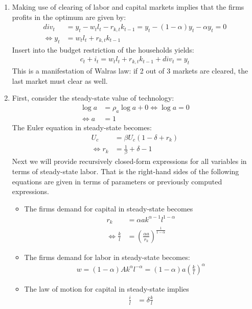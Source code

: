 \begin{enumerate}
\item Making use of clearing of labor and capital markets implies that the firms profits in the optimum are given by:
\begin{align*}
{div}_t &= y_t - w_t l_{t} - r_{k,t} k_{t-1} = y_t - (1-\alpha)y_t - \alpha y_t = 0
\\
\Leftrightarrow y_t &= w_t l_{t} + r_{k,t} k_{t-1}
\end{align*}
Insert into the budget restriction of the households yields:
\begin{align*}
c_t + i_t = w_t l_{t} + r_{k,t} k_{t-1} + {div}_t = y_t
\end{align*}
This is a manifestation of Walras law: if 2 out of 3 markets are cleared, the last market must clear as well.

\item First, consider the steady-state value of technology:
\begin{align*}
\log{a}&=\rho_a \log{a} + 0 \Leftrightarrow \log{a} = 0
\\
\Leftrightarrow a &= 1 
\end{align*}
The Euler equation in steady-state becomes:
\begin{align*}
U_c &= \beta U_c (1-\delta+r_k)
\\
\Leftrightarrow r_k &= \frac{1}{\beta} + \delta - 1
\end{align*}
Next we will provide recursively closed-form expressions for all variables in terms of steady-state labor.
That is the right-hand sides of the following equations are given in terms of parameters or previously computed expressions.

\begin{itemize}

\item The firms demand for capital in steady-state becomes
\begin{align*}
r_k &= \alpha a k^{\alpha-1} l^{1-\alpha}
\\
\Leftrightarrow \frac{k}{l} &= {\left(\frac{\alpha a}{r_k}\right)}^{\frac{1}{1-\alpha}}
\end{align*}

\item The firms demand for labor in steady-state becomes:
\begin{align*}
w = (1-\alpha) A k^\alpha l^{-\alpha} = (1-\alpha)a {\left(\frac{k}{l}\right)}^\alpha
\end{align*}

\item The law of motion for capital in steady-state implies
\begin{align*}
\frac{i}{l} &= \delta\frac{k}{l}
\end{align*}


\end{itemize}
\end{enumerate}
